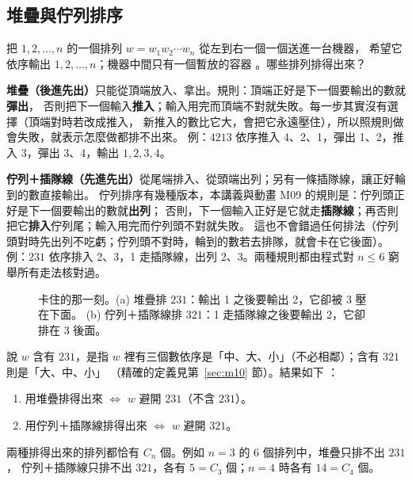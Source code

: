 

\subsection{堆疊與佇列排序}\label{sec:m09}

把 $1,2,\ldots,n$ 的一個排列 $w=w_1w_2\cdots w_n$ 從左到右一個一個送進一台機器，
希望它依序輸出 $1,2,\ldots,n$；機器中間只有一個暫放的容器 。哪些排列排得出來？

\textbf{堆疊（後進先出）}只能從頂端放入、拿出。規則：頂端正好是下一個要輸出的數就\textbf{彈出}，
否則把下一個輸入\textbf{推入}；輸入用完而頂端不對就失敗。每一步其實沒有選擇（頂端對時若改成推入，
新推入的數比它大，會把它永遠壓住），所以照規則做會失敗，就表示怎麼做都排不出來。
例：$4213$ 依序推入 4、2、1，彈出 1、2，推入 3，彈出 3、4，輸出 $1,2,3,4$。

\textbf{佇列＋插隊線（先進先出）}從尾端排入、從頭端出列；另有一條插隊線，讓正好輪到的數直接輸出。
佇列排序有幾種版本，本講義與動畫 M09 的規則是：佇列頭正好是下一個要輸出的數就\textbf{出列}；
否則，下一個輸入正好是它就走\textbf{插隊線}；再否則把它\textbf{排入}佇列尾；輸入用完而佇列頭不對就失敗。
這也不會錯過任何排法（佇列頭對時先出列不吃虧；佇列頭不對時，輪到的數若去排隊，就會卡在它後面）。
例：$231$ 依序排入 2、3，1 走插隊線，出列 2、3。兩種規則都由程式對 $n\le 6$ 窮舉所有走法核對過。

\begin{figure}[H]
\centering
\FigMnineStuck
\caption{卡住的那一刻。(a) 堆疊排 $231$：輸出 1 之後要輸出 \textcolor{cB}{2}，它卻被 \textcolor{cBad}{3} 壓在下面。
(b) 佇列＋插隊線排 $321$：1 走插隊線之後要輸出 \textcolor{cB}{2}，它卻排在 \textcolor{cBad}{3} 後面。}
\label{fig:m09-stuck}
\end{figure}

說 $w$ 含有 $231$，是指 $w$ 裡有三個數依序是「中、大、小」（不必相鄰）；含有 $321$ 則是「大、中、小」
（精確的定義見第~\ref{sec:m10} 節）。結果如下 ：

\begin{thmbox}[可排序的排列]
\begin{enumerate}[leftmargin=1.6em]
  \item 用堆疊排得出來 $\iff$ $w$ 避開 $231$（不含 $231$）。
  \item 用佇列＋插隊線排得出來 $\iff$ $w$ 避開 $321$。
\end{enumerate}
兩種排得出來的排列都恰有 $C_n$ 個。例如 $n=3$ 的 6 個排列中，堆疊只排不出 $231$，
佇列＋插隊線只排不出 $321$，各有 $5=C_3$ 個；$n=4$ 時各有 $14=C_4$ 個。
\end{thmbox}


